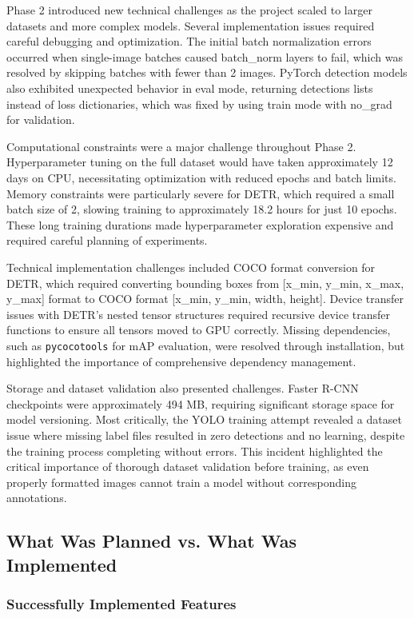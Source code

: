 \documentclass[12pt,a4paper]{article}
\begin{document}
Phase 2 introduced new technical challenges as the project scaled to larger datasets and more complex models. Several implementation issues required careful debugging and optimization. The initial batch normalization errors occurred when single-image batches caused batch\_norm layers to fail, which was resolved by skipping batches with fewer than 2 images. PyTorch detection models also exhibited unexpected behavior in eval mode, returning detections lists instead of loss dictionaries, which was fixed by using train mode with no\_grad for validation.

Computational constraints were a major challenge throughout Phase 2. Hyperparameter tuning on the full dataset would have taken approximately 12 days on CPU, necessitating optimization with reduced epochs and batch limits. Memory constraints were particularly severe for DETR, which required a small batch size of 2, slowing training to approximately 18.2 hours for just 10 epochs. These long training durations made hyperparameter exploration expensive and required careful planning of experiments.

Technical implementation challenges included COCO format conversion for DETR, which required converting bounding boxes from [x\_min, y\_min, x\_max, y\_max] format to COCO format [x\_min, y\_min, width, height]. Device transfer issues with DETR's nested tensor structures required recursive device transfer functions to ensure all tensors moved to GPU correctly. Missing dependencies, such as \texttt{pycocotools} for mAP evaluation, were resolved through installation, but highlighted the importance of comprehensive dependency management.

Storage and dataset validation also presented challenges. Faster R-CNN checkpoints were approximately 494 MB, requiring significant storage space for model versioning. Most critically, the YOLO training attempt revealed a dataset issue where missing label files resulted in zero detections and no learning, despite the training process completing without errors. This incident highlighted the critical importance of thorough dataset validation before training, as even properly formatted images cannot train a model without corresponding annotations.

\subsection{What Was Planned vs. What Was Implemented}

\subsubsection{Successfully Implemented Features}
\end{document}
